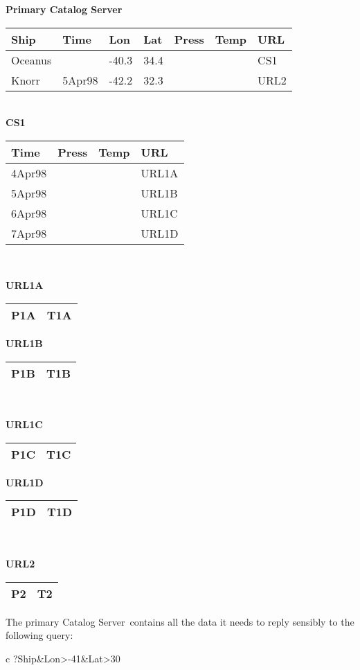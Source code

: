 \documentclass[10pt]{report}
\newcommand{\cs}{Catalog Server}
\begin{document}
\begin{center}
\textbf{Primary \cs} \\
\begin{tabular}{|l|l|l|l|l|l|l|} \hline
Ship    &Time    &Lon  &Lat &Press &Temp &URL \\ \hline
Oceanus &       &-40.3 &34.4&      &     &CS1 \\
Knorr   &5Apr98 &-42.2 &32.3&      &     &URL2 \\ \hline 
\end{tabular}

\strut \\ \textbf{CS1}\\
\begin{tabular}{|l|l|l|l|} \hline
Time    &Press &Temp &URL \\ \hline
4Apr98  &      &     &URL1A \\
5Apr98  &      &     &URL1B \\
6Apr98  &      &     &URL1C \\
7Apr98  &      &     &URL1D \\ \hline
\end{tabular} \\ {\huge\strut}
\textbf{URL1A}
\begin{tabular}{|c|c|} \hline
P1A &T1A \\ \hline
\end{tabular}
\hfill
\textbf{URL1B}
\begin{tabular}{|c|c|} \hline
P1B &T1B \\ \hline
\end{tabular} \\ {\huge\strut} 
\textbf{URL1C}
\begin{tabular}{|c|c|} \hline
P1C &T1C \\ \hline
\end{tabular} 
\hfill
\textbf{URL1D}
\begin{tabular}{|c|c|} \hline
P1D &T1D \\ \hline
\end{tabular} \\ {\huge\strut}
\textbf{URL2}
\begin{tabular}{|c|c|} \hline
P2   &T2 \\ \hline
\end{tabular}
\end{center}

The primary \cs\ contains all the data it needs to reply sensibly to
the following query:

\begin{code}{c}
?Ship&Lon>-41&Lat>30
\end{code}
\end{document}
